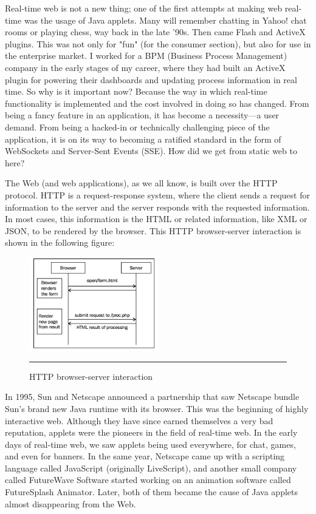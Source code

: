 Real-time web is not a new thing; one of the first attempts at making web real-time
was the usage of Java applets. Many will remember chatting in Yahoo! chat rooms or
playing chess, way back in the late '90s. Then came Flash and ActiveX plugins. This
was not only for "fun" (for the consumer section), but also for use in the enterprise
market. I worked for a BPM (Business Process Management) company in the early
stages of my career, where they had built an ActiveX plugin for powering their
dashboards and updating process information in real time. So why is it important
now? Because the way in which real-time functionality is implemented and the cost
involved in doing so has changed. From being a fancy feature in an application,
it has become a necessity—a user demand. From being a hacked-in or technically
challenging piece of the application, it is on its way to becoming a ratified standard
in the form of WebSockets and Server-Sent Events (SSE). How did we get from static
web to here?

The Web (and web applications), as we all know, is built over the HTTP protocol.
HTTP is a request-response system, where the client sends a request for information
to the server and the server responds with the requested information. In most
cases, this information is the HTML or related information, like XML or JSON, to
be rendered by the browser. This HTTP browser-server interaction is shown in the
following figure:

\begin{figure}[h!]
  \centering
    \includegraphics[width=0.5\textwidth]{./Pictures/http.jpg}
  \rule{0.5\textwidth}{1pt}
    \caption{HTTP browser-server interaction}
\end{figure}

In 1995, Sun and Netscape announced a partnership that saw Netscape bundle
Sun's brand new Java runtime with its browser. This was the beginning of highly
interactive web. Although they have since earned themselves a very bad reputation,
applets were the pioneers in the field of real-time web. In the early days of real-time
web, we saw applets being used everywhere, for chat, games, and even for banners.
In the same year, Netscape came up with a scripting language called JavaScript
(originally LiveScript), and another small company called FutureWave Software
started working on an animation software called FutureSplash Animator. Later,
both of them became the cause of Java applets almost disappearing from the Web.

